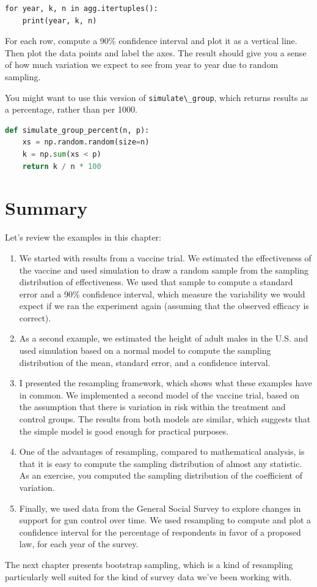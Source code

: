 \begin{lstlisting}[style=output]
for year, k, n in agg.itertuples():
    print(year, k, n)
\end{lstlisting}

For each row, compute a 90\% confidence interval and plot it as a
vertical line. Then plot the data points and label the axes. The result
should give you a sense of how much variation we expect to see from year
to year due to random sampling.

You might want to use this version of
\passthrough{\lstinline!simulate\_group!}, which returns results as a
percentage, rather than per 1000.

\begin{lstlisting}[language=Python,style=source]
def simulate_group_percent(n, p):
    xs = np.random.random(size=n)
    k = np.sum(xs < p)
    return k / n * 100
\end{lstlisting}

\hypertarget{summary}{%
\section{Summary}\label{summary}}

Let's review the examples in this chapter:

\begin{enumerate}
\def\labelenumi{\arabic{enumi}.}
\item
  We started with results from a vaccine trial. We estimated the
  effectiveness of the vaccine and used simulation to draw a random
  sample from the sampling distribution of effectiveness. We used that
  sample to compute a standard error and a 90\% confidence interval,
  which measure the variability we would expect if we ran the experiment
  again (assuming that the observed efficacy is correct).
\item
  As a second example, we estimated the height of adult males in the
  U.S. and used simulation based on a normal model to compute the
  sampling distribution of the mean, standard error, and a confidence
  interval.
\item
  I presented the resampling framework, which shows what these examples
  have in common. We implemented a second model of the vaccine trial,
  based on the assumption that there is variation in risk within the
  treatment and control groups. The results from both models are
  similar, which suggests that the simple model is good enough for
  practical purposes.
\item
  One of the advantages of resampling, compared to mathematical
  analysis, is that it is easy to compute the sampling distribution of
  almost any statistic. As an exercise, you computed the sampling
  distribution of the coefficient of variation.
\item
  Finally, we used data from the General Social Survey to explore
  changes in support for gun control over time. We used resampling to
  compute and plot a confidence interval for the percentage of
  respondents in favor of a proposed law, for each year of the survey.
\end{enumerate}

The next chapter presents bootstrap sampling, which is a kind of
resampling particularly well suited for the kind of survey data we've
been working with.

